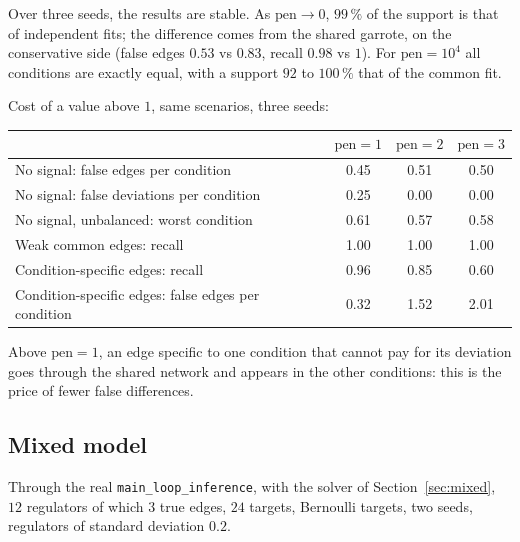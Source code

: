 \documentclass[a4paper, 11pt]{article}
\newcommand{\pen}{\mathrm{pen}}
\theoremstyle{plain}
\theoremstyle{remark}
\begin{document}
Over three seeds, the results are stable. As $\pen \to 0$, $99\,\%$ of the support is that of independent fits; the difference comes from the shared garrote, on the conservative side (false edges $0.53$ vs $0.83$, recall $0.98$ vs $1$). For $\pen = 10^4$ all conditions are exactly equal, with a support $92$ to $100\,\%$ that of the common fit.

Cost of a value above $1$, same scenarios, three seeds:

\begin{center}\small
\begin{tabular}{lccc}
\toprule
 & $\pen = 1$ & $\pen = 2$ & $\pen = 3$ \\
\midrule
No signal: false edges per condition & 0.45 & 0.51 & 0.50 \\
No signal: false deviations per condition & 0.25 & 0.00 & 0.00 \\
No signal, unbalanced: worst condition & 0.61 & 0.57 & 0.58 \\
Weak common edges: recall & 1.00 & 1.00 & 1.00 \\
Condition-specific edges: recall & 0.96 & 0.85 & 0.60 \\
Condition-specific edges: false edges per condition & 0.32 & 1.52 & 2.01 \\
\bottomrule
\end{tabular}
\end{center}

Above $\pen = 1$, an edge specific to one condition that cannot pay for its deviation goes through the shared network and appears in the other conditions: this is the price of fewer false differences.

\subsection{Mixed model}

Through the real \texttt{main\_loop\_inference}, with the solver of Section~\ref{sec:mixed}, $12$ regulators of which $3$ true edges, $24$ targets, Bernoulli targets, two seeds, regulators of standard deviation $0.2$.
\end{document}

